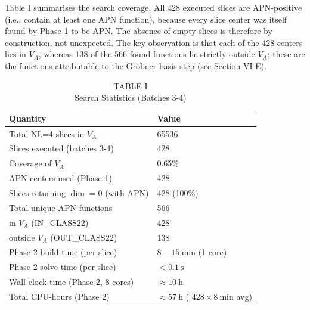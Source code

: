 \documentclass[10pt]{article}
\begin{document}
Table I summarises the search coverage. All 428 executed slices are APN-positive (i.e., contain at least one APN function), because every slice center was itself found by Phase 1 to be APN. The absence of empty slices is therefore by construction, not unexpected. The key observation is that each of the 428 centers lies in $V_{A}$, whereas 138 of the 566 found functions lie strictly outside $V_{A}$; these are the functions attributable to the Gröbner basis step (see Section VI-E).

\begin{table}[h]
\begin{center}
\captionsetup{labelformat=empty}
\caption{TABLE I\\
Search Statistics (Batches 3-4)}
\begin{tabular}{|l|l|}
\hline
Quantity & Value \\
\hline
Total NL=4 slices in $V_{A}$ & 65536 \\
\hline
Slices executed (batches 3-4) & 428 \\
\hline
Coverage of $V_{A}$ & 0.65\% \\
\hline
APN centers used (Phase 1) & 428 \\
\hline
Slices returning $\operatorname{dim}=0$ (with APN) & 428 (100\%) \\
\hline
Total unique APN functions & 566 \\
\hline
in $V_{A}$ (IN\_CLASS22) & 428 \\
\hline
outside $V_{A}$ (OUT\_CLASS22) & 138 \\
\hline
Phase 2 build time (per slice) & $8-15 \mathrm{~min}$ (1 core) \\
\hline
Phase 2 solve time (per slice) & $<0.1 \mathrm{~s}$ \\
\hline
Wall-clock time (Phase 2, 8 cores) & $\approx 10 \mathrm{~h}$ \\
\hline
Total CPU-hours (Phase 2) & $\approx 57 \mathrm{~h}$ ( $428 \times 8 \mathrm{~min}$ avg) \\
\hline
\end{tabular}
\end{center}
\end{table}
\end{document}
